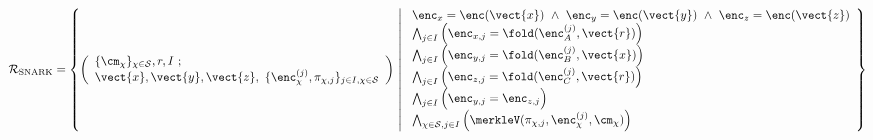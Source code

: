 

\[
\mathcal{R}_{\text{SNARK}} = \left\{
\left( 
\begin{array}{l}
\{ \cm_{\chi} \}_{\chi \in \mathcal{S}}, r, I \ ; 
\\
\vect{x},\vect{y},\vect{z}, \ \{ \enc_{\chi}^{(j)}, \pi_{\chi,j} \}_{j \in I, \chi \in \mathcal{S}}
\end{array}
\right)
\ \middle\vert \
\begin{array}{l}
\enc_x = \enc(\vect{x}) \ \land \
\enc_y = \enc(\vect{y}) \ \land \
\enc_z = \enc(\vect{z})
\\
\bigwedge_{j \in I} \left( \enc_{x,j} = \fold(\enc_A^{(j)},\vect{r}) \right)
\\
\bigwedge_{j \in I} \left( \enc_{y,j} = \fold(\enc_B^{(j)},\vect{x}) \right)
\\
\bigwedge_{j \in I} \left( \enc_{z,j} = \fold(\enc_C^{(j)},\vect{r}) \right)
\\
\bigwedge_{j \in I} \Big( \enc_{y,j} = \enc_{z,j} \Big)
\\
\bigwedge_{\chi \in \mathcal{S}, j \in I} \left(  \merkleV(\pi_{\chi,j},\enc_{\chi}^{(j)},\cm_{\chi}) \right)
\end{array}
\right\}
\]


